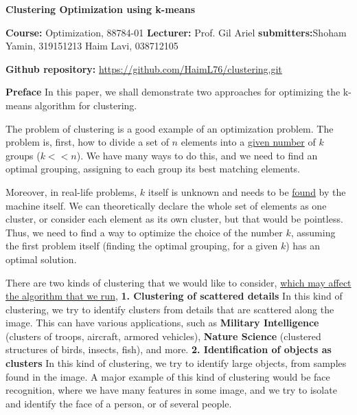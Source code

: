 \documentclass[12pt]{article}
\begin{document}
\onehalfspacing
\textbf{\huge Clustering Optimization using k-means} \newline

\textbf{\large Course:} Optimization, 88784-01 \newline
\textbf{\large Lecturer:} Prof. Gil Ariel \newline
\textbf{\large submitters:}\newline Shoham Yamin, 319151213 \newline
Haim Lavi, 038712105 \newline

\textbf{\large Github repository:} \href{https://github.com/HaimL76/clustering.git}{https://github.com/HaimL76/clustering.git}\newline 

\textbf{\large Preface} \newline
In this paper, we shall demonstrate two approaches for optimizing the \newline
k-means algorithm for clustering. \newline

The problem of clustering is a good example of an optimization problem. \newline 
The problem is, first, how to divide a set of $n$ elements into a \underline{given number} of $k$ groups ($k << n$). We have many ways to do this, and we need to find an optimal grouping, assigning to each group its best matching elements. \newline

Moreover, in real-life problems, $k$ itself is unknown and needs to be \underline{found} by the machine itself. We can theoretically declare the whole set of elements as one cluster, or consider each element as its own cluster, but that would be pointless. Thus, we need to find a way to optimize the choice of the number $k$, assuming the first problem itself (finding the optimal grouping, for a given $k$) has an optimal solution. \newline

There are two kinds of clustering that we would like to consider, \newline
\underline{which may affect the algorithm that we run}, \newline \newline
\textbf{1. Clustering of scattered details} \newline
In this kind of clustering, we try to identify clusters from details that are scattered along the image.
This can have various applications, such as \newline \textbf{Military Intelligence} (clusters of troops, aircraft, armored vehicles), \newline
\textbf{Nature Science} (clustered structures of birds, insects, fish), and more.
\newpage
\textbf{2. Identification of objects as clusters} \newline
In this kind of clustering, we try to identify large objects, from samples found in the image. A major example of this kind of clustering would be face recognition, 
where we have many features in some image, and we try to isolate and
identify the face of a person, or of several people. \newline
\end{document}
